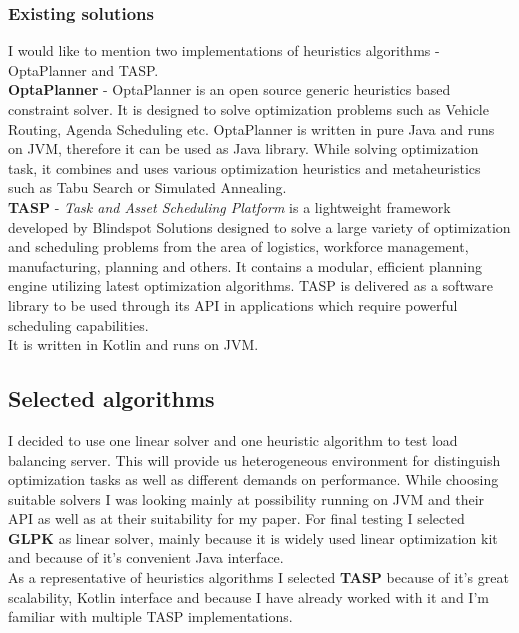 \subsubsection{Existing solutions}\label{subsec:existing-solutions-heur}
I would like to mention two implementations of heuristics algorithms - OptaPlanner and TASP\@.\\

\textbf{OptaPlanner} - OptaPlanner is an open source generic heuristics based constraint solver.
It is designed to solve optimization problems such as Vehicle Routing, Agenda Scheduling etc.
OptaPlanner is written in pure Java and runs on JVM, therefore it can be used as Java library.
While solving optimization task, it combines and uses various optimization heuristics and metaheuristics such as
Tabu Search or Simulated Annealing.\\

\textbf{TASP} - \textit{Task and Asset Scheduling Platform}  is a lightweight framework developed by Blindspot Solutions designed to solve a large
variety of optimization and scheduling problems from the area of logistics, workforce management, manufacturing, planning and others.
It contains a modular, efficient planning engine utilizing latest optimization algorithms.
TASP is delivered as a software library to be used through its API in applications which require powerful scheduling capabilities.\\
It is written in Kotlin and runs on JVM\@.

\subsection{Selected algorithms}\label{subsec:selected-algorithms}
I decided to use one linear solver and one heuristic algorithm to test load balancing server.
This will provide us heterogeneous environment for distinguish optimization tasks as well as different demands on performance.
While choosing suitable solvers I was looking mainly at possibility running on JVM and their API as well as at their suitability for my paper.
For final testing I selected \textbf{GLPK} as linear solver, mainly because it is widely used linear optimization kit
and because of it's convenient Java interface.\\
As a representative of heuristics algorithms I selected \textbf{TASP} because of it's great scalability, Kotlin interface
and because I have already worked with it and I'm familiar with multiple TASP implementations.
